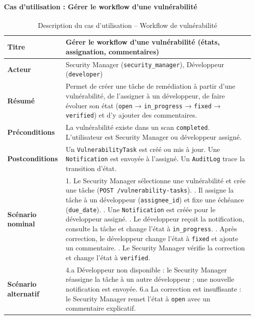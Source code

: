 \paragraph{Cas d'utilisation : Gérer le workflow d'une vulnérabilité}
\begin{table}[H]
\centering
\caption{Description du cas d'utilisation -- Workflow de vulnérabilité}
\label{tab:uc-vulnworkflow}
\small
\renewcommand{\arraystretch}{1.3}
\begin{tabularx}{\textwidth}{>{\bfseries}p{3.5cm} X}
\hline
Titre & Gérer le workflow d'une vulnérabilité (états, assignation, commentaires) \\
\hline
Acteur & Security Manager (\texttt{security\_manager}), Développeur (\texttt{developer}) \\
\hline
Résumé & Permet de créer une tâche de remédiation à partir d'une vulnérabilité, de l'assigner à un développeur, de faire évoluer son état (\texttt{open} → \texttt{in\_progress} → \texttt{fixed} → \texttt{verified}) et d'y ajouter des commentaires. \\
\hline
Préconditions & La vulnérabilité existe dans un scan \texttt{completed}. L'utilisateur est Security Manager ou développeur assigné. \\
\hline
Postconditions & Un \texttt{VulnerabilityTask} est créé ou mis à jour. Une \texttt{Notification} est envoyée à l'assigné. Un \texttt{AuditLog} trace la transition d'état. \\
\hline
Scénario nominal &
1. Le Security Manager sélectionne une vulnérabilité et crée une tâche (\texttt{POST /vulnerability-tasks}). \newline
2. Il assigne la tâche à un développeur (\texttt{assignee\_id}) et fixe une échéance (\texttt{due\_date}). \newline
3. Une \texttt{Notification} est créée pour le développeur assigné. \newline
4. Le développeur reçoit la notification, consulte la tâche et change l'état à \texttt{in\_progress}. \newline
5. Après correction, le développeur change l'état à \texttt{fixed} et ajoute un commentaire. \newline
6. Le Security Manager vérifie la correction et change l'état à \texttt{verified}. \\
\hline
Scénario alternatif &
4.a Développeur non disponible : le Security Manager réassigne la tâche à un autre développeur ; une nouvelle notification est envoyée. \newline
6.a La correction est insuffisante : le Security Manager remet l'état à \texttt{open} avec un commentaire explicatif. \\
\hline
\end{tabularx}
\end{table}

